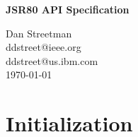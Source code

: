 \documentclass{article}
\newcommand{\mytitle}[0]{JSR80 API Specification}
\newcommand{\myauthor}[0]{Dan Streetman}
\newcommand{\mydate}[0]{\today}
\begin{document}
\pagestyle{empty}


%

\begin{titlepage}

\begin{center}
\Huge{\textbf{\mytitle}}
\end{center}

\vfill
\vfill

\begin{flushright}
\large{\myauthor}
\\
\large{ddstreet@ieee.org}
\\
\large{ddstreet@us.ibm.com}
\\
\large{\mydate}
\end{flushright}

\vfill

\end{titlepage}

%

\pagestyle{fancy}
\fancyhf{}
\renewcommand{\sectionmark}[1]{\markright{\emph{\mytitle}}}
\renewcommand{\subsectionmark}[1]{\markright{\emph{\mytitle}}}
\renewcommand{\subsubsectionmark}[1]{\markright{\emph{\mytitle}}}
\fancyhead[LE,RO]{\bfseries\thepage}
\fancyhead[LO]{\rightmark}

%

\tableofcontents

\listoftables

\listoffigures

\pagebreak


%

\section{Initialization}
\end{document}
